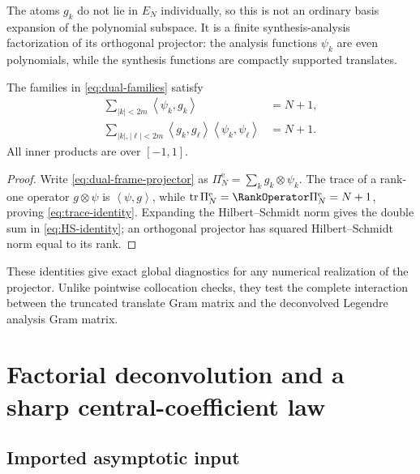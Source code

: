 \documentclass[11pt,oneside]{article}
\numberwithin{equation}{section}
\theoremstyle{definition}
\theoremstyle{remark}
\newcommand{\PiE}{\Pi^{\mathrm e}}
\newcommand{\tr}{\operatorname{tr}}
\newcommand{\inner}[2]{\left\langle#1,#2\right\rangle}
\begin{document}
The atoms $g_k$ do not lie in $E_N$ individually, so this is not an ordinary
basis expansion of the polynomial subspace.  It is a finite synthesis-analysis
factorization of its orthogonal projector: the analysis functions $\psi_k$ are
even polynomials, while the synthesis functions are compactly supported
translates.

\begin{corollary}
\label{cor:trace-identities}
The families in \eqref{eq:dual-families} satisfy
\begin{align}
 \sum_{|k|<2m}\inner{\psi_k}{g_k}&=N+1,
 \label{eq:trace-identity}\\
 \sum_{|k|,|\ell|<2m}
 \inner{g_k}{g_\ell}\inner{\psi_k}{\psi_\ell}&=N+1.
 \label{eq:HS-identity}
\end{align}
All inner products are over $[-1,1]$.
\end{corollary}

\begin{proof}
Write \eqref{eq:dual-frame-projector} as
$\PiE_N=\sum_k g_k\otimes\psi_k$.  The trace of a rank-one operator
$g\otimes\psi$ is $\inner{\psi}{g}$, while
$\tr\PiE_N=\RankOperator\PiE_N=N+1$, proving \eqref{eq:trace-identity}.  Expanding the
Hilbert--Schmidt norm gives the double sum in \eqref{eq:HS-identity}; an
orthogonal projector has squared Hilbert--Schmidt norm equal to its rank.
\end{proof}

These identities give exact global diagnostics for any numerical realization
of the projector.  Unlike pointwise collocation checks, they test the complete
interaction between the truncated translate Gram matrix and the deconvolved
Legendre analysis Gram matrix.

\section{Factorial deconvolution and a sharp central-coefficient law}
\label{sec:asymptotic}

\subsection{Imported asymptotic input}
\end{document}
